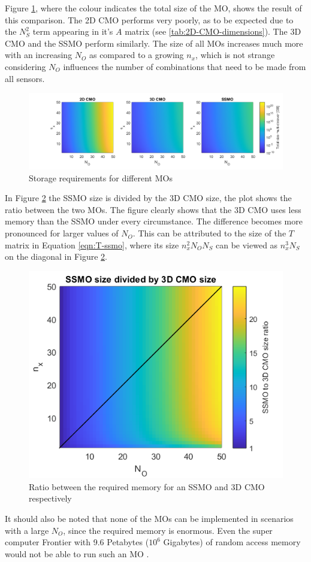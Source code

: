 Figure \ref{fig:MO-storage}, where the colour indicates the total size of the MO, shows the result of this comparison. The 2D CMO performs very poorly, as to be expected due to the $N_S^2$ term appearing in it's $A$ matrix (see \autoref{tab:2D-CMO-dimensions}). The 3D CMO and the SSMO perform similarly. The size of all MOs increases much more with an increasing $N_O$ as compared to a growing $n_x$, which is not strange considering $N_O$ influences the number of combinations that need to be made from all sensors.


\begin{figure}[H]
    \centering
    \includegraphics[width=\linewidth]{report/Figures/sizeComparison60.png}
    \caption{Storage requirements for different MOs}
    \label{fig:MO-storage}
\end{figure}


In Figure \ref{fig:ssmo-vs-3dcmo} the SSMO size is divided by the 3D CMO size, the plot shows the ratio between the two MOs. The figure clearly shows that the 3D CMO uses less memory than the SSMO under every circumstance. The difference becomes more pronounced for larger values of $N_O$. This can be attributed to the size of the $T$ matrix in Equation \ref{eqn:T-ssmo}, where its size $n_x^2N_ON_S$ can be viewed as $n_x^3N_S$ on the diagonal in Figure \ref{fig:ssmo-vs-3dcmo}.

\begin{figure}[H]
    \centering
    \includegraphics[width=0.4\linewidth]{report/Figures/ssmo_vs_3dcmo.png}
    \caption{Ratio between the required memory for an SSMO and 3D CMO respectively}
    \label{fig:ssmo-vs-3dcmo}
\end{figure}

It should also be noted that none of the MOs can be implemented in scenarios with a large $N_O$, since the required memory is enormous. Even the super computer Frontier with 9.6 Petabytes ($10^6$ Gigabytes) of random access memory would not be able to run such an MO \cite{FrontierDocumentation}.